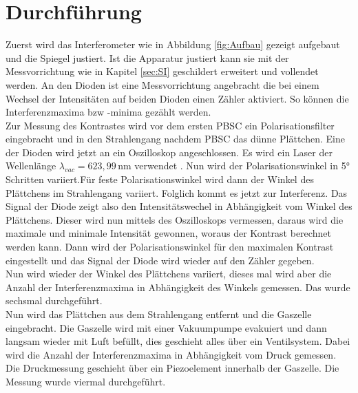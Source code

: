 \section{Durchführung}
\label{sec:Durchführung}
Zuerst wird das Interferometer wie in Abbildung \ref{fig:Aufbau} gezeigt aufgebaut und die Spiegel justiert.
Ist die Apparatur justiert kann sie mit der Messvorrichtung wie in Kapitel \ref{sec:SI} geschildert erweitert
und vollendet werden. An den Dioden ist eine Messvorrichtung angebracht die bei einem Wechsel der Intensitäten
auf beiden Dioden einen Zähler aktiviert. So können die Interferenzmaxima bzw -minima gezählt werden.\\
Zur Messung des Kontrastes wird vor dem ersten PBSC ein Polarisationsfilter eingebracht und in den Strahlengang nachdem PBSC
das dünne Plättchen. Eine der Dioden wird jetzt an ein Oszilloskop angeschlossen.
Es wird ein Laser der Wellenlänge $\lambda_{vac}= 623,99\,$nm verwendet \cite{Anleitung}. Nun wird der
Polarisationswinkel in 5° Schritten variiert.Für feste Polarisationswinkel wird dann der Winkel des Plättchens im Strahlengang variiert.
Folglich kommt es jetzt zur Interferenz. Das Signal der Diode zeigt also den Intensitätswechel in Abhängigkeit vom
Winkel des Plättchens. Dieser wird nun mittels des Oszilloskops vermessen, daraus wird die maximale und minimale
Intensität gewonnen, woraus der Kontrast berechnet werden kann. Dann wird der Polarisationswinkel für
den maximalen Kontrast eingestellt und das Signal der Diode wird wieder auf den Zähler gegeben. \\
Nun wird wieder der Winkel des Plättchens variiert, dieses mal wird aber die Anzahl der
Interferenzmaxima in Abhängigkeit des Winkels gemessen. Das wurde sechsmal durchgeführt. \\
Nun wird das Plättchen aus dem Strahlengang entfernt und die Gaszelle eingebracht.
Die Gaszelle wird mit einer Vakuumpumpe evakuiert und dann langsam wieder mit Luft befüllt, dies
geschieht alles über ein Ventilsystem. Dabei wird die Anzahl der Interferenzmaxima in Abhängigkeit vom
Druck gemessen. Die Druckmessung geschieht über ein Piezoelement innerhalb der Gaszelle. Die Messung wurde
viermal durchgeführt.
